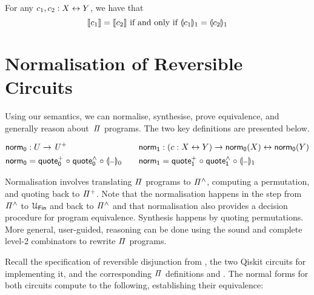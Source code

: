\begin{theorem}
  For any $c_1, c_2 : X \mathrel{\leftrightarrow} Y$, we have that
  \[
    \llbracket c_1\rrbracket = \llbracket c_2\rrbracket \text{ if and only if } \llparenthesis c_1\rrparenthesis_{1} = \llparenthesis c_2\rrparenthesis_{1}
  \]
\end{theorem}

\section{Normalisation of Reversible Circuits}
\label{sec:applications}

Using our semantics, we can normalise, synthesise, prove equivalence, and generally reason about~$\mathit{\Pi}$ programs. The
two key definitions are presented below.

\begin{definition}
  \begin{gather*}
    \begin{aligned}
      \normt_{0} & : U \to \UPlus                                            \\
      \normt_{0} & = \quotep_{0} \comp \quoteh_{0} \comp \gdenot{\blank}_{0}
    \end{aligned}
    \qquad
    \begin{aligned}
      \normt_{1} & : (c : X \iso Y) \to \normt_{0}(X) \iso \normt_{0}(Y)     \\
      \normt_{1} & = \quotep_{1} \comp \quoteh_{1} \comp \gdenot{\blank}_{1}
    \end{aligned}
  \end{gather*}
\end{definition}

\noindent Normalisation involves translating $\mathit{\Pi}$ programs to $\mathit{{\Pi}^{\wedge}}$, computing a permutation, and quoting
back to $\mathit{{\Pi}^{+}}$. Note that the normalisation happens in the step from $\mathit{{\Pi}^{\wedge}}$ to $\UFin$ and back to
$\mathit{{\Pi}^{\wedge}}$ and that normalisation also provides a decision procedure for program equivalence. Synthesis happens by
quoting permutations. More general, user-guided, reasoning can be done using the sound and complete level-2
combinators to rewrite $\mathit{\Pi}$ programs.

Recall the specification of reversible disjunction from , the two Qiskit circuits for implementing
it, and the corresponding $\mathit{\Pi}$ definitions  and . The normal forms for both
circuits compute to the following, establishing their equivalence:

